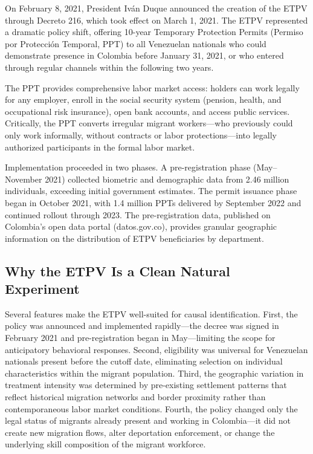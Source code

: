 \documentclass[12pt]{article}
\begin{document}
On February 8, 2021, President Iv\'an Duque announced the creation of the ETPV through Decreto 216, which took effect on March 1, 2021. The ETPV represented a dramatic policy shift, offering 10-year Temporary Protection Permits (Permiso por Protecci\'on Temporal, PPT) to all Venezuelan nationals who could demonstrate presence in Colombia before January 31, 2021, or who entered through regular channels within the following two years.

The PPT provides comprehensive labor market access: holders can work legally for any employer, enroll in the social security system (pension, health, and occupational risk insurance), open bank accounts, and access public services. Critically, the PPT converts irregular migrant workers---who previously could only work informally, without contracts or labor protections---into legally authorized participants in the formal labor market.

Implementation proceeded in two phases. A pre-registration phase (May--November 2021) collected biometric and demographic data from 2.46 million individuals, exceeding initial government estimates. The permit issuance phase began in October 2021, with 1.4 million PPTs delivered by September 2022 and continued rollout through 2023. The pre-registration data, published on Colombia's open data portal (datos.gov.co), provides granular geographic information on the distribution of ETPV beneficiaries by department.

\subsection{Why the ETPV Is a Clean Natural Experiment}

Several features make the ETPV well-suited for causal identification. First, the policy was announced and implemented rapidly---the decree was signed in February 2021 and pre-registration began in May---limiting the scope for anticipatory behavioral responses. Second, eligibility was universal for Venezuelan nationals present before the cutoff date, eliminating selection on individual characteristics within the migrant population. Third, the geographic variation in treatment intensity was determined by pre-existing settlement patterns that reflect historical migration networks and border proximity rather than contemporaneous labor market conditions. Fourth, the policy changed only the legal status of migrants already present and working in Colombia---it did not create new migration flows, alter deportation enforcement, or change the underlying skill composition of the migrant workforce.
\end{document}
